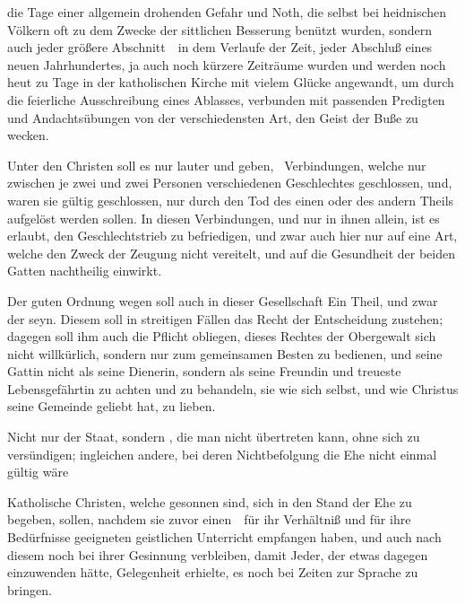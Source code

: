 \begin{RWanm}
die Tage einer allgemein drohenden Gefahr und Noth, die selbst bei heidnischen Völkern oft zu dem Zwecke der sittlichen Besserung benützt wurden, sondern auch jeder größere Abschnitt~\ in dem Verlaufe der Zeit, jeder Abschluß eines neuen Jahrhundertes, ja auch noch kürzere Zeiträume wurden und werden noch heut zu Tage in der katholischen Kirche mit vielem Glücke angewandt, um durch die feierliche Ausschreibung eines Ablasses, verbunden mit passenden Predigten und Andachtsübungen von der verschiedensten Art, den Geist der Buße zu wecken. 
\end{RWanm}

\begin{aufza}
\item Unter den Christen soll es nur lauter  und  geben, \dh\  Verbindungen, welche nur zwischen je zwei und zwei Personen verschiedenen Geschlechtes geschlossen, und, waren sie gültig geschlossen, nur durch den Tod des einen oder des andern Theils aufgelöst werden sollen. In diesen Verbindungen, und nur in ihnen allein, ist es erlaubt, den Geschlechtstrieb zu befriedigen, und zwar auch hier nur auf eine Art, welche den Zweck der Zeugung nicht vereitelt, und auf die Gesundheit der beiden Gatten nachtheilig einwirkt.
\item Der guten Ordnung wegen soll auch in dieser Gesellschaft Ein Theil, und zwar der   seyn. Diesem soll in streitigen Fällen das Recht der Entscheidung zustehen; dagegen soll ihm auch die Pflicht obliegen, dieses Rechtes der Obergewalt sich nicht willkürlich, sondern nur zum gemeinsamen Besten zu bedienen, und seine Gattin nicht als seine Dienerin, sondern als seine Freundin und treueste Lebensgefährtin zu achten und zu behandeln, sie wie sich selbst, und wie Christus seine Gemeinde geliebt hat, zu lieben.
\item Nicht nur der Staat, sondern , die man nicht übertreten kann, ohne sich zu versündigen; ingleichen andere, bei deren Nichtbefolgung die Ehe nicht einmal gültig wäre 
\item Katholische Christen, welche gesonnen sind, sich in den Stand der Ehe zu begeben, sollen, nachdem sie zuvor einen~\ für ihr Verhältniß und für ihre Bedürfnisse geeigneten geistlichen Unterricht empfangen haben, und auch nach diesem noch bei ihrer Gesinnung verbleiben,  damit Jeder, der etwas dagegen einzuwenden hätte, Gelegenheit erhielte, es noch bei Zeiten zur Sprache zu bringen.

\end{aufza}
